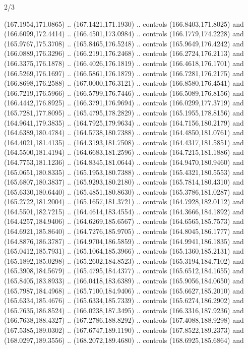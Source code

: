 \begin{flagdescription}{2/3}
\begin{scope}[shift={(0.5\flaglength,0.5)},scale=\flagwidth/320]
\begin{scope}[y=0.8pt, x=0.8pt, yscale=-1,shift={(-118.3,-146)}]
  (167.1954,171.0865) .. (167.1421,171.1930) .. controls (166.8403,171.8025) and
  (166.6099,172.4414) .. (166.4501,173.0984) .. controls (166.1779,174.2228) and
  (165.9767,175.3708) .. (165.8465,176.5248) .. controls (165.9649,176.4242) and
  (166.0889,176.3296) .. (166.2191,176.2468) .. controls (166.2724,176.2113) and
  (166.3375,176.1878) .. (166.4026,176.1819) .. controls (166.4618,176.1701) and
  (166.5269,176.1697) .. (166.5861,176.1879) .. controls (166.7281,176.2175) and
  (166.8698,176.2588) .. (167.0000,176.3121) .. controls (166.8580,176.4541) and
  (166.7219,176.5966) .. (166.5799,176.7446) .. controls (166.5089,176.8156) and
  (166.4442,176.8925) .. (166.3791,176.9694) .. controls (166.0299,177.3719) and
  (165.7281,177.8095) .. (165.4795,178.2829) .. controls (165.1955,178.8156) and
  (164.9641,179.3835) .. (164.7925,179.9634) .. controls (164.7156,180.2179) and
  (164.6389,180.4784) .. (164.5738,180.7388) .. controls (164.4850,181.0761) and
  (164.4021,181.4135) .. (164.3193,181.7508) .. controls (164.4317,181.5851) and
  (164.5500,181.4194) .. (164.6683,181.2596) .. controls (164.7215,181.1886) and
  (164.7753,181.1236) .. (164.8345,181.0644) .. controls (164.9470,180.9460) and
  (165.0651,180.8335) .. (165.1953,180.7388) .. controls (165.4321,180.5553) and
  (165.6807,180.3837) .. (165.9293,180.2180) .. controls (165.7814,180.4310) and
  (165.6330,180.6440) .. (165.4851,180.8630) .. controls (165.3786,181.0287) and
  (165.2722,181.2004) .. (165.1657,181.3721) .. controls (164.7928,182.0112) and
  (164.5501,182.7215) .. (164.4614,183.4554) .. controls (164.3666,184.1892) and
  (164.4257,184.9406) .. (164.6269,185.6567) .. controls (164.6565,185.7573) and
  (164.6921,185.8640) .. (164.7276,185.9705) .. controls (164.8045,186.1777) and
  (164.8876,186.3787) .. (164.9704,186.5859) .. controls (164.9941,186.1835) and
  (165.0412,185.7931) .. (165.1064,185.3966) .. controls (165.1360,185.2131) and
  (165.1892,185.0298) .. (165.2602,184.8523) .. controls (165.3194,184.7102) and
  (165.3908,184.5679) .. (165.4795,184.4377) .. controls (165.6512,184.1655) and
  (165.8405,183.8933) .. (166.0418,183.6389) .. controls (165.9056,184.0650) and
  (165.7987,184.4968) .. (165.7100,184.9406) .. controls (165.6627,185.2010) and
  (165.6334,185.4676) .. (165.6334,185.7339) .. controls (165.6274,186.2902) and
  (165.7635,186.8524) .. (166.0238,187.3495) .. controls (166.3316,187.9236) and
  (166.7638,188.4327) .. (167.2786,188.8292) .. controls (167.4088,188.9298) and
  (167.5385,189.0302) .. (167.6747,189.1190) .. controls (167.8522,189.2373) and
  (168.0297,189.3556) .. (168.2072,189.4680) .. controls (168.6925,185.6864) and

\end{scope}
\end{scope}
\end{flagdescription}
